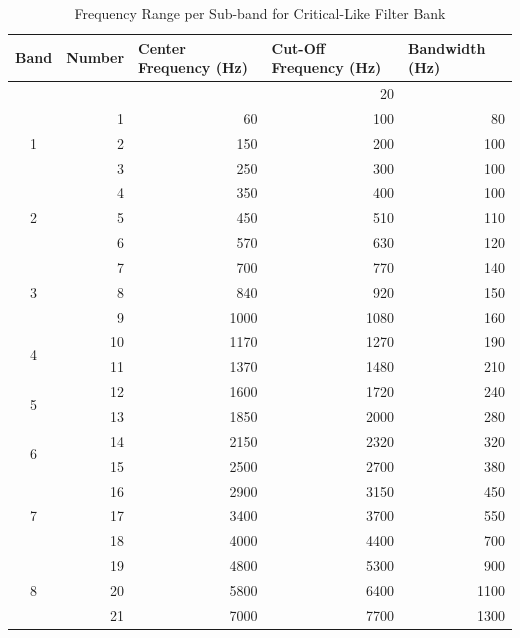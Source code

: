 \documentclass[11pt,onecolumn]{witseiepaper}
\begin{document}
\begin{appendices}
\begin{table}[htbp]
  \centering
  \caption{Frequency Range per Sub-band for Critical-Like Filter Bank}
  \begin{adjustbox}{width=0.9\linewidth}
    \begin{tabular}{|c|r|r|r|r|}
    \hline
    \multicolumn{1}{|l|}{\textbf{Band}} & \multicolumn{1}{l|}{\textbf{Number}} & \multicolumn{1}{l|}{\textbf{Center Frequency (Hz) }} & \multicolumn{1}{l|}{\textbf{Cut-Off Frequency (Hz)}} & \multicolumn{1}{l|}{\textbf{Bandwidth (Hz)}} \\
    \hline
          &       &       & 20    &  \\
    \hline
    \multirow{3}[6]{*}{1} & 1     & 60    & 100   & 80 \\
\cline{2-5}          & 2     & 150   & 200   & 100 \\
\cline{2-5}          & 3     & 250   & 300   & 100 \\
    \hline
    \multirow{3}[6]{*}{2} & 4     & 350   & 400   & 100 \\
\cline{2-5}          & 5     & 450   & 510   & 110 \\
\cline{2-5}          & 6     & 570   & 630   & 120 \\
    \hline
    \multirow{3}[6]{*}{3} & 7     & 700   & 770   & 140 \\
\cline{2-5}          & 8     & 840   & 920   & 150 \\
\cline{2-5}          & 9     & 1000  & 1080  & 160 \\
    \hline
    \multirow{2}[4]{*}{4} & 10    & 1170  & 1270  & 190 \\
\cline{2-5}          & 11    & 1370  & 1480  & 210 \\
    \hline
    \multirow{2}[4]{*}{5} & 12    & 1600  & 1720  & 240 \\
\cline{2-5}          & 13    & 1850  & 2000  & 280 \\
    \hline
    \multirow{2}[4]{*}{6} & 14    & 2150  & 2320  & 320 \\
\cline{2-5}          & 15    & 2500  & 2700  & 380 \\
    \hline
    \multirow{3}[6]{*}{7} & 16    & 2900  & 3150  & 450 \\
\cline{2-5}          & 17    & 3400  & 3700  & 550 \\
\cline{2-5}          & 18    & 4000  & 4400  & 700 \\
    \hline
    \multirow{3}[6]{*}{8} & 19    & 4800  & 5300  & 900 \\
\cline{2-5}          & 20    & 5800  & 6400  & 1100 \\
\cline{2-5}          & 21    & 7000  & 7700  & 1300 \\
    \hline
    \end{tabular}%
    \end{adjustbox}
  \label{tab:critFiltFreqBand}%
\end{table}%


\end{appendices}
\end{document}
